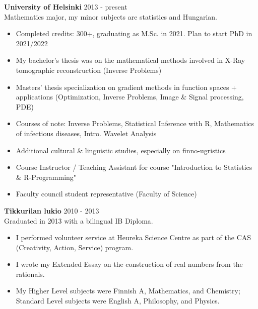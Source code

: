 \documentclass[margin, 10pt]{res} %
\begin{document}
\begin{resume}
\textbf{University of Helsinki} \hfill 2013 - present\\
Mathematics major, my minor subjects are statistics and Hungarian.
\begin{itemize} \itemsep -2pt
\item Completed credits: 300+, graduating as M.Sc. in 2021. Plan to start PhD in 2021/2022
\item My bachelor's thesis was on the mathematical methods involved in X-Ray tomographic reconstruction (Inverse Problems)
\item Masters' thesis specialization on gradient methods in function spaces + applications (Optimization, Inverse Problems, Image \& Signal processing, PDE)
\item Courses of note: Inverse Problems, Statistical Inference with R, Mathematics of infectious diseases, Intro. Wavelet Analysis
\item Additional cultural \& linguistic studies, especially on finno-ugristics
\item Course Instructor / Teaching Assistant for course "Introduction to Statistics \& R-Programming"
\item Faculty council student representative (Faculty of Science)
\end{itemize}

\addvspace{-7pt}
\textbf{Tikkurilan lukio} \hfill 2010 - 2013\\
Graduated in 2013 with a bilingual IB Diploma.
\begin{itemize} \itemsep -2pt
\item I performed volunteer service at Heureka Science Centre as part of the CAS (Creativity, Action, Service) program.
\item I wrote my Extended Essay on the construction of real numbers from the rationals.
\item My Higher Level subjects were Finnish A, Mathematics, and Chemistry; Standard Level subjects were English A, Philosophy, and Physics. 
\end{itemize}




\end{resume}
\end{document}
